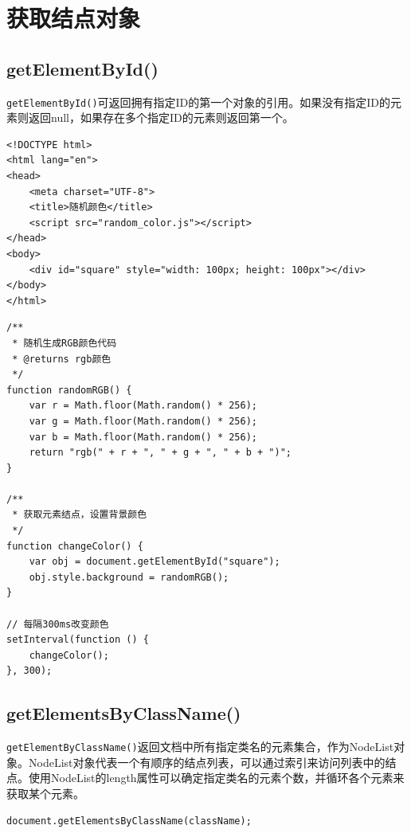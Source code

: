 \newpage

\section{获取结点对象}

\subsection{getElementById()}

\lstinline|getElementById()|可返回拥有指定ID的第一个对象的引用。如果没有指定ID的元素则返回null，如果存在多个指定ID的元素则返回第一个。 \\


\begin{lstlisting}[style=htmlcssjs, title=random\_color.html]
<!DOCTYPE html>
<html lang="en">
<head>
    <meta charset="UTF-8">
    <title>随机颜色</title>
    <script src="random_color.js"></script>
</head>
<body>
    <div id="square" style="width: 100px; height: 100px"></div>
</body>
</html>
\end{lstlisting}

\begin{lstlisting}[style=htmlcssjs, title=random\_color.js]
/**
 * 随机生成RGB颜色代码
 * @returns rgb颜色
 */
function randomRGB() {
    var r = Math.floor(Math.random() * 256);
    var g = Math.floor(Math.random() * 256);
    var b = Math.floor(Math.random() * 256);
    return "rgb(" + r + ", " + g + ", " + b + ")";
}

/**
 * 获取元素结点，设置背景颜色
 */
function changeColor() {
    var obj = document.getElementById("square");
    obj.style.background = randomRGB();
}

// 每隔300ms改变颜色
setInterval(function () {
    changeColor();
}, 300);
\end{lstlisting}

\subsection{getElementsByClassName()}

\lstinline|getElementByClassName()|返回文档中所有指定类名的元素集合，作为NodeList对象。NodeList对象代表一个有顺序的结点列表，可以通过索引来访问列表中的结点。使用NodeList的length属性可以确定指定类名的元素个数，并循环各个元素来获取某个元素。 \\

\begin{lstlisting}[style=htmlcssjs]
document.getElementsByClassName(className);
\end{lstlisting}

